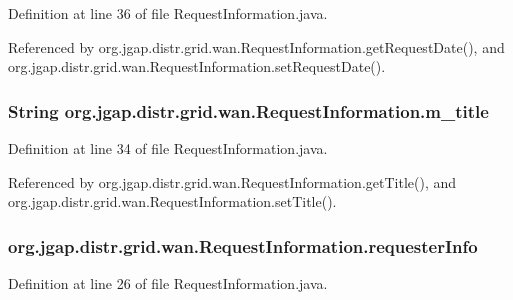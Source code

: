Definition at line 36 of file Request\-Information.\-java.



Referenced by org.\-jgap.\-distr.\-grid.\-wan.\-Request\-Information.\-get\-Request\-Date(), and org.\-jgap.\-distr.\-grid.\-wan.\-Request\-Information.\-set\-Request\-Date().

\hypertarget{classorg_1_1jgap_1_1distr_1_1grid_1_1wan_1_1_request_information_adaeb6dd64202d4e8b593019e4118b928}{
\subsubsection[{m\-\_\-title}]{\setlength{\rightskip}{0pt plus 5cm}String org.\-jgap.\-distr.\-grid.\-wan.\-Request\-Information.\-m\-\_\-title\hspace{0.3cm}{\ttfamily [private]}}}\label{classorg_1_1jgap_1_1distr_1_1grid_1_1wan_1_1_request_information_adaeb6dd64202d4e8b593019e4118b928}


Definition at line 34 of file Request\-Information.\-java.



Referenced by org.\-jgap.\-distr.\-grid.\-wan.\-Request\-Information.\-get\-Title(), and org.\-jgap.\-distr.\-grid.\-wan.\-Request\-Information.\-set\-Title().

\hypertarget{classorg_1_1jgap_1_1distr_1_1grid_1_1wan_1_1_request_information_a0972ea4c6983634980701f47280e42b3}{
\subsubsection[{requester\-Info}]{ org.\-jgap.\-distr.\-grid.\-wan.\-Request\-Information.\-requester\-Info}}\label{classorg_1_1jgap_1_1distr_1_1grid_1_1wan_1_1_request_information_a0972ea4c6983634980701f47280e42b3}


Definition at line 26 of file Request\-Information.\-java.

